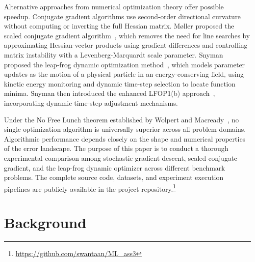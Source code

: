 \documentclass[conference,10pt]{IEEEtran}
\begin{document}
Alternative approaches from numerical optimization theory offer possible speedup. Conjugate gradient algorithms use second-order directional curvature without computing or inverting the full Hessian matrix. M\o{}ller proposed the scaled conjugate gradient algorithm~\cite{moller1993}, which removes the need for line searches by approximating Hessian-vector products using gradient differences and controlling matrix instability with a Levenberg-Marquardt scale parameter. Snyman proposed the leap-frog dynamic optimization method~\cite{snyman1982}, which models parameter updates as the motion of a physical particle in an energy-conserving field, using kinetic energy monitoring and dynamic time-step selection to locate function minima. Snyman then introduced the enhanced LFOP1(b) approach~\cite{snyman1983}, incorporating dynamic time-step adjustment mechanisms.

Under the No Free Lunch theorem established by Wolpert and Macready~\cite{wolpert1997}, no single optimization algorithm is universally superior across all problem domains. Algorithmic performance depends closely on the shape and numerical properties of the error landscape. The purpose of this paper is to conduct a thorough experimental comparison among stochastic gradient descent, scaled conjugate gradient, and the leap-frog dynamic optimizer across different benchmark problems. The complete source code, datasets, and experiment execution pipelines are publicly available in the project repository.\footnote{\url{https://github.com/swantaan/ML_ass3}}

\section{Background}
\end{document}

